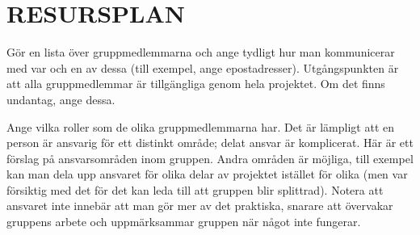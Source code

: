 \documentclass[a4paper]{article}
\begin{document}
\section{RESURSPLAN}
\label{sec:resurs}


Gör en lista över gruppmedlemmarna och ange tydligt hur man kommunicerar
med var och en av dessa (till exempel, ange epostadresser).
Utgångspunkten är att alla gruppmedlemmar är tillgängliga genom hela
projektet. Om det finns undantag, ange dessa.

Ange vilka roller som de olika gruppmedlemmarna har. Det är lämpligt att
en person är ansvarig för ett distinkt område; delat ansvar är
komplicerat. Här är ett förslag på ansvarsområden inom gruppen. Andra
områden är möjliga, till exempel kan man dela upp ansvaret för olika
delar av projektet istället för olika (men var försiktig med det för det 
kan leda till att gruppen blir splittrad). Notera att ansvaret inte
innebär att man gör mer av det praktiska, snarare att övervakar gruppens
arbete och uppmärksammar gruppen när något inte fungerar.
\end{document}
